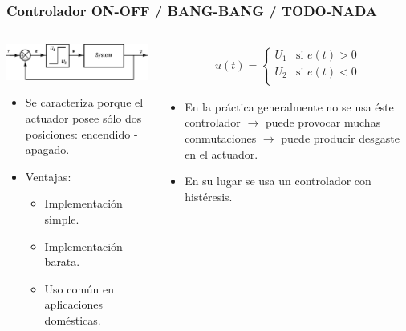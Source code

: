 \documentclass[aspectratio=169,handout]{beamer}
\theoremstyle{definition}
\theoremstyle{plain}
\theoremstyle{remark}
\begin{document}
\begin{frame}[<+->]\frametitle{Controlador ON-OFF / BANG-BANG / TODO-NADA}
\begin{columns}
  \begin{column}{0.5\textwidth}
    \vspace*{5mm}
    \includegraphics[width=7cm]{images/onoffcontroller.eps}
    \vspace*{-5mm}
    \begin{itemize}
      \item Se caracteriza porque el actuador posee sólo dos posiciones: encendido - apagado.
      \item Ventajas:
      \begin{itemize}
        \item Implementación simple.
        \item Implementación barata.
        \item Uso común en aplicaciones domésticas.
      \end{itemize}
    \end{itemize}
  \end{column} 
  \begin{column}{0.5\textwidth}
    \begin{align*}
      u(t) =
      \begin{cases}
        U_1 & \text{si } e(t) > 0\\
        U_2 & \text{si } e(t) < 0\\
      \end{cases}
    \end{align*}
    \begin{itemize}
      \item En la práctica generalmente no se usa éste controlador $\rightarrow$ puede provocar muchas conmutaciones $\rightarrow$ puede producir desgaste en el actuador.
      \item En su lugar se usa un controlador con histéresis.
    \end{itemize}
  \end{column} 
\end{columns}
\end{frame}
\end{document}
